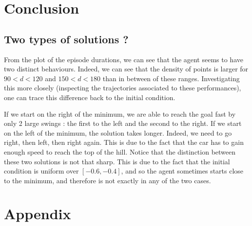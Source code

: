 \documentclass[a4paper, 12pt,oneside]{article}
\begin{document}
        \section{Conclusion}
        \subsection{Two types of solutions ?}
        From the plot of the episode durations, we can see that the agent seems to have two distinct behaviours. Indeed, we can see that the density of points is larger for $90<d<120$ and $150<d<180$ than in between of these ranges. Investigating this more closely (inspecting the trajectories associated to these performances), one can trace this difference back to the initial condition. 
        
        If we start on the right of the minimum, we are able to reach the goal fast by only 2 large swings : the first to the left and the second to the right. If we start on the left of the minimum, the solution takes longer. Indeed, we need to go right, then left, then right again. This is due to the fact that the car has to gain enough speed to reach the top of the hill.
        Notice that the distinction between these two solutions is not that sharp. This is due to the fact that the initial condition is uniform over $[-0.6,-0.4]$, and so the agent sometimes starts close to the minimum, and therefore is not exactly in any of the two cases. 
        \section{Appendix}
\end{document}
